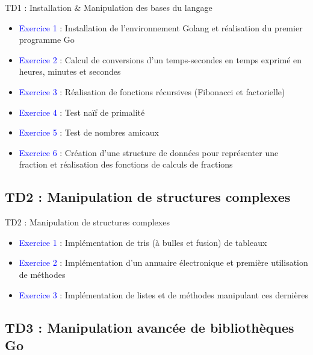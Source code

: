 \documentclass{beamer}
\begin{document}
\begin{frame}
\begin{block}{TD1 : Installation \& Manipulation des bases du langage} 
	\begin{itemize}
		[circle]
		\item \textcolor{blue}{Exercice 1} : Installation de l'environnement Golang et réalisation du premier programme Go 
		\item \textcolor{blue}{Exercice 2} : Calcul de conversions d'un temps-secondes en temps exprimé en heures, minutes et secondes
		\item \textcolor{blue}{Exercice 3} : Réalisation de fonctions récursives (Fibonacci et factorielle)
		\item \textcolor{blue}{Exercice 4} : Test naïf de primalité
		\item \textcolor{blue}{Exercice 5} : Test de nombres amicaux
		\item \textcolor{blue}{Exercice 6} : Création d'une structure de données pour représenter une fraction et réalisation des fonctions de calculs de fractions
	\end{itemize}
\end{block}
\end{frame}

\subsection{TD2 : Manipulation de structures complexes}

\begin{frame}
\begin{block}{TD2 : Manipulation de structures complexes} 
	\begin{itemize}
		[circle]
		\item \textcolor{blue}{Exercice 1} : Implémentation de tris (à bulles et fusion) de tableaux
		\item \textcolor{blue}{Exercice 2} : Implémentation d'un annuaire électronique et première utilisation de méthodes
		\item \textcolor{blue}{Exercice 3} : Implémentation de listes et de méthodes manipulant ces dernières 
	\end{itemize}
\end{block}
\end{frame}

\subsection{TD3 : Manipulation avancée de bibliothèques Go}
\end{document}
